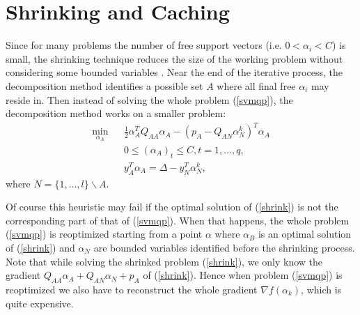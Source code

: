 \documentclass[11pt]{article}
\theoremstyle{break}
\begin{document}
\section{Shrinking and Caching}
\label{shrinking}

Since for many problems
the number of free support 
vectors
(i.e. $0 < \alpha_i < C$) is small,
the shrinking technique  reduces the 
size of the working problem
without considering some bounded variables
.
Near the end of 
the iterative process, the 
decomposition method
identifies a possible set $A$
where all final free $\alpha_i$
may reside in.
Then instead of solving the whole
problem (\ref{svmqp}), 
the decomposition method
works on a smaller
 problem:
\begin{eqnarray}
\min_{\alpha_A} && \frac{1}{2} \alpha_A^T Q_{AA} \alpha_A 
- (p_A - Q_{AN} \alpha^k_N)^T \alpha_A \nonumber \\
&& 0 \leq (\alpha_A)_t \leq C,  
t = 1, \ldots, q, \label{shrink} \\
&& y_A^T \alpha_A = \Delta -y_N^T \alpha^k_N,   \nonumber 
\end{eqnarray}
where $N = \{1, \ldots, l\} 
\backslash A$.

Of course this heuristic may fail if the
optimal solution of (\ref{shrink}) is not
the corresponding part of 
that of (\ref{svmqp}).
When that happens, the whole 
problem (\ref{svmqp}) is reoptimized starting
from a point
$\alpha$ where 
$\alpha_B$ is an optimal solution
of (\ref{shrink}) and
$\alpha_N$ are bounded variables 
identified before the shrinking process. 
Note that while
solving the shrinked problem 
(\ref{shrink}),
 we only know the
gradient 
$Q_{AA} \alpha_A + Q_{AN} \alpha_N
+ p_A$ of (\ref{shrink}).
Hence 
when problem (\ref{svmqp}) is reoptimized
we also have
to reconstruct the whole gradient
$\nabla f(\alpha_k)$, which is quite 
expensive.
\end{document}
